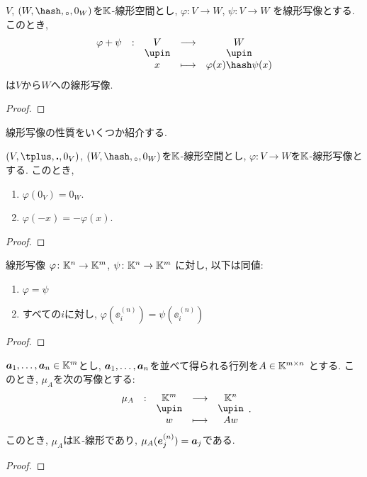 \begin{example}
  $V$, $(W,\pplus,\aact,0_W)$を$\mathbb{K}$-線形空間とし,
  $\varphi\colon V\to W$,
  $\psi\colon V\to W$
  を線形写像とする.
  このとき, 
  \begin{align*}
  \shazo{\varphi+\psi}{V}{W}
  {x}{\varphi(x) \pplus \psi(x)}
  \end{align*}
  は$V$から$W$への線形写像.
\end{example}
\begin{proof}\end{proof}


線形写像の性質をいくつか紹介する.
\begin{prop}
  $(V,\plus,\act,0_V)$, $(W,\pplus,\aact,0_W)$を$\mathbb{K}$-線形空間とし,
  $\varphi\colon V\to W$を$\mathbb{K}$-線形写像とする.
  このとき,
  \begin{enumerate}
    \item $\varphi(0_V)=0_W$.
    \item $\varphi(-x)=-\varphi(x)$.
  \end{enumerate}
\end{prop}
\begin{proof}\end{proof}

\begin{prop}
\label{prop:linmap:kn:1}
線形写像
$\varphi\colon \mathbb{K}^n \to \mathbb{K}^m$,
$\psi\colon \mathbb{K}^n \to \mathbb{K}^m$
に対し, 以下は同値:
\begin{enumerate}
\item $\varphi=\psi$
\item すべての$i$に対し, $\varphi(\ee^{(n)}_i)=\psi(\ee^{(n)}_i)$
\end{enumerate}
\end{prop}
\begin{proof}\end{proof}

\begin{prop}
\label{prop:linmap:kn:2}
  $\boldsymbol{a}_1,\ldots, \boldsymbol{a}_n \in \mathbb{K}^m$とし,
  $\boldsymbol{a}_1,\ldots, \boldsymbol{a}_n $を並べて得られる行列を$A\in\mathbb{K}^{m\times n}$
  とする.
  このとき, $\mu_A$を次の写像とする:
  \begin{align*}
    \shazo{\mu_A}{\KK^m}{\KK^n}{w}{Aw}.
  \end{align*}
  このとき, $\mu_A$は$\mathbb{K}$-線形であり,
   $\mu_A(\boldsymbol{e}^{(n)}_j)=\boldsymbol{a}_j$である.
\end{prop}
\begin{proof}\end{proof}

